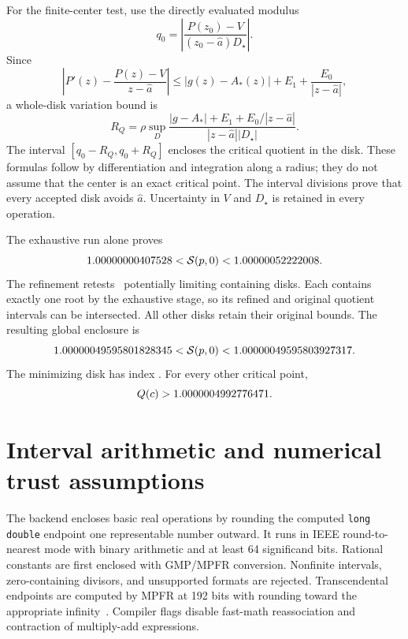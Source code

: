 \documentclass[11pt,a4paper]{article}
\newcommand{\astar}{\widehat a}
\begin{document}
For the finite-center test, use the directly evaluated modulus
\[
 q_0=\left|\frac{P(z_0)-V}{(z_0-\astar)D_\star}\right|.
\]
Since
\[
 \left|P'(z)-\frac{P(z)-V}{z-\astar}\right|
 \le |g(z)-A_*(z)|+E_1+\frac{E_0}{|z-\astar|},
\]
a whole-disk variation bound is
\begin{equation}\label{eq:finite-value}
 R_Q=\rho\sup_D
 \frac{|g-A_*|+E_1+E_0/|z-\astar|}{|z-\astar||D_\star|}.
\end{equation}
The interval $[q_0-R_Q,q_0+R_Q]$ encloses the critical quotient in the disk.
These formulas follow by differentiation and integration along a radius;
they do not assume that the center is an exact critical point.
The interval divisions prove that every accepted disk avoids $\astar$.
Uncertainty in $V$ and $D_\star$ is retained in every operation.



The exhaustive run alone proves
\[
 1.00000000407528<\mathcal S(p,0)<1.00000052222008.
\]
The refinement retests \RefinedCount\ potentially limiting containing disks.
Each contains exactly one root by the exhaustive stage, so its refined and
original quotient intervals can be intersected. All other disks retain their
original bounds. The resulting global enclosure is
\[
 1.00000049595801828345<\mathcal S(p,0)<1.00000049595803927317.
\]
The minimizing disk has index \MinimizerIndex. For every other critical point,
\[Q(c)>1.0000004992776471.\]
\UniquenessExplanation
\section{Interval arithmetic and numerical trust assumptions}\label{sec:arithmetic}
The backend encloses basic real operations by rounding the computed
\texttt{long double} endpoint one representable number outward. It runs in
IEEE round-to-nearest mode with binary arithmetic and at least 64 significand
bits. Rational constants are first enclosed with GMP/MPFR conversion.
Nonfinite intervals, zero-containing divisors, and unsupported formats are
rejected. Transcendental endpoints are computed by MPFR at 192 bits with
rounding toward the appropriate infinity~\cite{MPFR}. Compiler flags disable
fast-math reassociation and contraction of multiply-add expressions.
\end{document}
